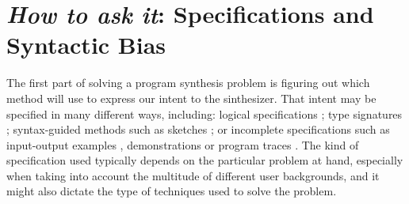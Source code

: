 \section{\textit{How to ask it}: Specifications and Syntactic Bias}
\label{sec:specifications}



The first part of solving a program synthesis problem is figuring out which
method will use to express our intent to the sinthesizer.
That intent may be specified in many different ways, including:
  logical specifications \cite{Itzhaky:SIS:2010};
  type signatures \cite{Osera:2015:TPS, Frankle:2016:EST, Polikarpova:2016:PSP};
  syntax-guided methods \cite{Alur:sygus:2013} such as
  sketches \cite{Solar-Lezama:2008};
  or incomplete specifications such as
  input-output examples \cite{Frankle:2016:EST, Gulwani:2012:SDM, Leung:2015:IPS},
  demonstrations \cite{Lau2003}
  or program traces \cite{Lau:traces:2003}.
The kind of specification used typically depends on the particular problem at
hand, especially when taking into account the multitude of different user
backgrounds, and it might also dictate the type of techniques used to solve the
problem.





